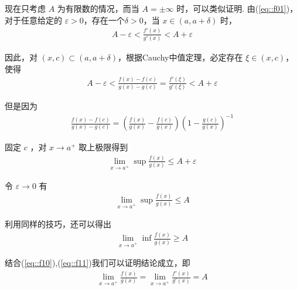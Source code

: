 \documentclass{ctexart}
\begin{document}
现在只考虑 $A$ 为有限数的情况，而当 $A =\pm \infty $ 时，可以类似证明.
由(\ref{eq::f01})，对于任意给定的 $\varepsilon >0$，存在一个$\delta >0$，当 $x \in (a,a+\delta)$ 时，
\begin{align}
  A-\varepsilon < \frac{f'(x)}{g'(x)} < A + \varepsilon
  \label{eq::f06}
\end{align}

因此，对 $(x,c) \subset (a,a+\delta)$，根据Cauchy中值定理，必定存在 $\xi \in (x,c)$，使得
\begin{align}
  A-\varepsilon <\frac{f(x)-f(c)}{g(x)-g(c)} = \frac{f'(\xi)}{g'(\xi)} < A + \varepsilon
  \label{eq::f07}
\end{align}

但是因为
\begin{align}
  \frac{f(x)-f(c)}{g(x)-g(c)} = (\frac{f(x)}{g(x)} - \frac{f(c)}{g(x)})(1-\frac{g(c)}{g(x)})^{-1}
  \label{eq:f08}
\end{align}

固定 $c$ ，对 $x\rightarrow a^{+}$ 取上极限得到
\begin{align}
  \lim _{x \rightarrow a^{+}} \sup \frac{f(x)}{g(x)} \leq A + \varepsilon
  \label{eq::f09}
\end{align}

令 $\varepsilon \rightarrow 0$ 有
\begin{align}
  \lim _{x \rightarrow a^{+}} \sup \frac{f(x)}{g(x)} \leq A
  \label{eq::f10}
\end{align}

利用同样的技巧，还可以得出
\begin{align}
  \lim _{x \rightarrow a^{+}} \inf \frac{f(x)}{g(x)} \geq A
  \label{eq::f11}
\end{align}

结合(\ref{eq::f10}),(\ref{eq::f11})我们可以证明结论成立，即
\begin{align}
  \lim _{x \rightarrow a^{+}} \frac{f(x)}{g(x)} = \lim _{x \rightarrow a^{+}} \frac{f'(x)}{g'(x)} = A
  \label{eq::f12}
\end{align}
\end{document}

